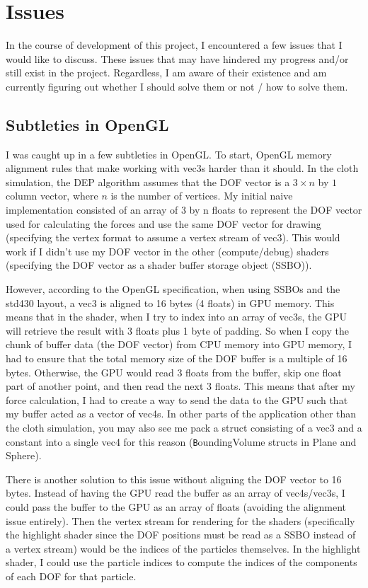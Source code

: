 \documentclass[letterpaper, 10 pt, conference]{ieeeconf}  %
\begin{document}
\section {Issues}
In the course of development of this project, I encountered a few issues that I would like to discuss. These issues that may have hindered my progress and/or still exist in the project. Regardless, I am aware of their existence and am currently figuring out whether I should solve them or not / how to solve them.

\subsection{Subtleties in OpenGL}
I was caught up in a few subtleties in OpenGL. To start, OpenGL memory alignment rules that make working with vec3s harder than it should. In the cloth simulation, the DEP algorithm assumes that the DOF vector is a $ 3 \times n $ by $ 1 $ column vector, where $n$ is the number of vertices. My initial naive implementation consisted of an array of 3 by n floats to represent the DOF vector used for calculating the forces and use the same DOF vector for drawing (specifying the vertex format to assume a vertex stream of vec3). This would work if I didn't use my DOF vector in the other (compute/debug) shaders (specifying the DOF vector as a shader buffer storage object (SSBO)).

However, according to the OpenGL specification, when using SSBOs and the std430 layout, a vec3 is aligned to 16 bytes (4 floats) in GPU memory. This means that in the shader, when I try to index into an array of vec3s, the GPU will retrieve the result with 3 floats plus 1 byte of padding. So when I copy the chunk of buffer data (the DOF vector) from CPU memory into GPU memory, I had to ensure that the total memory size of the DOF buffer is a multiple of 16 bytes. Otherwise, the GPU would read 3 floats from the buffer, skip one float part of another point, and then read the next 3 floats. This means that after my force calculation, I had to create a way to send the data to the GPU such that my buffer acted as a vector of vec4s. In other parts of the application other than the cloth simulation, you may also see me pack a struct consisting of a vec3 and a constant into a single vec4 for this reason (\texttt BoundingVolume structs in Plane and Sphere).

There is another solution to this issue without aligning the DOF vector to 16 bytes. Instead of having the GPU read the buffer as an array of vec4s/vec3s, I could pass the buffer to the GPU as an array of floats (avoiding the alignment issue entirely). Then the vertex stream for rendering for the shaders (specifically the highlight shader since the DOF positions must be read as a SSBO instead of a vertex stream) would be the indices of the particles themselves. In the highlight shader, I could use the particle indices to compute the indices of the components of each DOF for that particle. 
\end{document}
